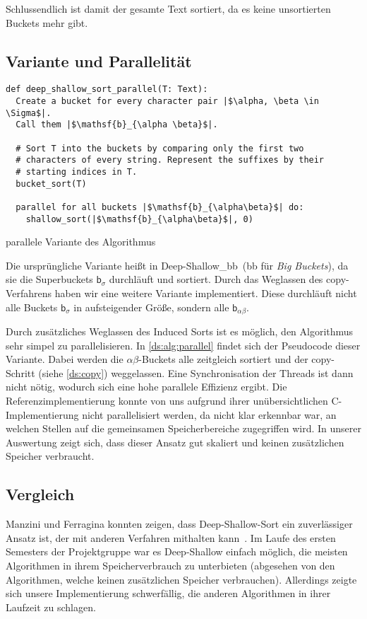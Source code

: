Schlussendlich ist damit der gesamte Text sortiert, da es keine unsortierten Buckets mehr gibt.


\subsection{Variante und Parallelität}
\label{ds:zweite}

\begin{listing}[!ht]
\begin{verbatim}
def deep_shallow_sort_parallel(T: Text):
  Create a bucket for every character pair |$\alpha, \beta \in \Sigma$|.
  Call them |$\mathsf{b}_{\alpha \beta}$|.

  # Sort T into the buckets by comparing only the first two
  # characters of every string. Represent the suffixes by their
  # starting indices in T.
  bucket_sort(T)

  parallel for all buckets |$\mathsf{b}_{\alpha\beta}$| do:
    shallow_sort(|$\mathsf{b}_{\alpha\beta}$|, 0)
\end{verbatim}
\caption{parallele Variante des Algorithmus}
\label{ds:alg:parallel}
\end{listing}

\noindent Die ursprüngliche Variante heißt in \sacabench \glqq Deep-Shallow\_bb\grqq~(bb für \emph{Big Buckets}),
da sie die Superbuckets $\mathsf b_\sigma$ durchläuft und sortiert.
Durch das Weglassen des copy-Verfahrens haben wir eine weitere Variante implementiert.
Diese durchläuft nicht alle Buckets $\mathsf b_\sigma$ in aufsteigender Größe,
sondern alle $\mathsf b_{\alpha\beta}$.

Durch zusätzliches Weglassen des Induced Sorts ist es möglich,
den Algorithmus sehr simpel zu parallelisieren.
In \cref{ds:alg:parallel} findet sich der Pseudocode dieser Variante.
Dabei werden die $\alpha\beta$-Buckets alle zeitgleich sortiert und
der copy-Schritt (siehe \cref{ds:copy}) weggelassen.
Eine Synchronisation der Threads ist dann nicht nötig, wodurch sich eine hohe parallele Effizienz ergibt.
Die Referenzimplementierung konnte von uns aufgrund ihrer unübersichtlichen C-Implementierung nicht parallelisiert werden,
da nicht klar erkennbar war, an welchen Stellen auf die gemeinsamen Speicherbereiche zugegriffen wird.
In unserer Auswertung zeigt sich, dass dieser Ansatz gut skaliert und keinen zusätzlichen Speicher verbraucht.

\subsection{Vergleich}
Manzini und Ferragina konnten zeigen, dass Deep-Shallow-Sort ein zuverlässiger Ansatz ist, der mit anderen Verfahren mithalten kann~\cite{saca:4}.
Im Laufe des ersten Semesters der Projektgruppe war es Deep-Shallow einfach möglich,
die meisten Algorithmen in ihrem Speicherverbrauch zu unterbieten (abgesehen von den Algorithmen, welche keinen zusätzlichen Speicher verbrauchen).
Allerdings zeigte sich unsere Implementierung schwerfällig, die anderen Algorithmen in ihrer Laufzeit zu schlagen.
